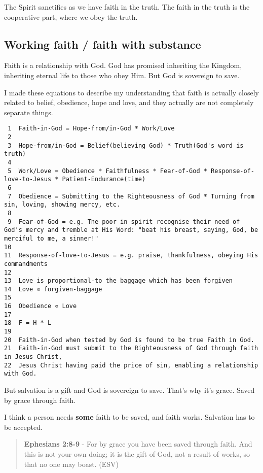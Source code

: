 \documentclass[11pt]{article}
\begin{document}
The Spirit sanctifies as we have faith in the truth.
The faith in the truth is the cooperative part, where we obey the truth.

\subsection{Working faith / faith with substance}
\label{sec:org0d6c789}

Faith is a relationship with God. God has promised inheriting the Kingdom, inheriting eternal life to those who obey Him. But God is sovereign to save.

I made these equations to describe my understanding that faith is actually closely related to belief, obedience, hope and love, and they actually are not completely separate things.

\begin{verbatim}
 1  Faith-in-God = Hope-from/in-God * Work/Love
 2  
 3  Hope-from/in-God = Belief(believing God) * Truth(God's word is truth)
 4  
 5  Work/Love = Obedience * Faithfulness * Fear-of-God * Response-of-love-to-Jesus * Patient-Endurance(time)
 6  
 7  Obedience = Submitting to the Righteousness of God * Turning from sin, loving, showing mercy, etc.
 8  
 9  Fear-of-God = e.g. The poor in spirit recognise their need of God's mercy and tremble at His Word: "beat his breast, saying, God, be merciful to me, a sinner!"
10  
11  Response-of-love-to-Jesus = e.g. praise, thankfulness, obeying His commandments
12  
13  Love is proportional-to the baggage which has been forgiven
14  Love ∝ forgiven-baggage
15  
16  Obedience ∝ Love
17  
18  F = H * L
19  
20  Faith-in-God when tested by God is found to be true Faith in God.
21  Faith-in-God must submit to the Righteousness of God through faith in Jesus Christ,
22  Jesus Christ having paid the price of sin, enabling a relationship with God.
\end{verbatim}

But salvation is a gift and God is sovereign to save.
That's why it's grace.
Saved by grace through faith.

I think a person needs \textbf{some} faith to be saved, and faith works. Salvation has to be accepted.

\begin{quote}
\textbf{Ephesians 2:8-9} - For by grace you have been saved through faith. And this is not your own doing; it is the gift of God, not a result of works, so that no one may boast. (ESV)
\end{quote}
\end{document}
